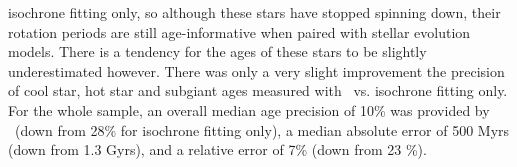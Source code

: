 isochrone fitting only, so although these stars have stopped spinning down,
their rotation periods are still age-informative when paired with stellar
evolution models.
There is a tendency for the ages of these stars to be slightly underestimated
however.
There was only a very slight improvement the precision of cool star, hot star
and subgiant ages measured with \sd\ vs. isochrone
fitting only.
For the whole sample, an overall median age precision of 10\% was provided by
\sd\ (down from 28\% for isochrone fitting only), a median absolute error of
500 Myrs (down from 1.3 Gyrs), and a relative error of 7\% (down from 23 \%).
